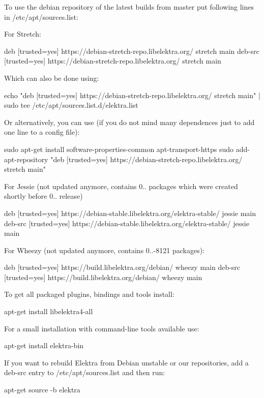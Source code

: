To use the debian repository of the latest builds from master put following lines in {\ttfamily /etc/apt/sources.list}\+:

For Stretch\+: \begin{DoxyVerb}    deb     [trusted=yes] https://debian-stretch-repo.libelektra.org/ stretch main
    deb-src [trusted=yes] https://debian-stretch-repo.libelektra.org/ stretch main
\end{DoxyVerb}


Which can also be done using\+: \begin{DoxyVerb}    echo "deb     [trusted=yes] https://debian-stretch-repo.libelektra.org/ stretch main" | sudo tee /etc/apt/sources.list.d/elektra.list
\end{DoxyVerb}


Or alternatively, you can use (if you do not mind many dependences just to add one line to a config file)\+: \begin{DoxyVerb}    sudo apt-get install software-properties-common apt-transport-https
    sudo add-apt-repository "deb     [trusted=yes] https://debian-stretch-repo.libelektra.org/ stretch main"
\end{DoxyVerb}


For Jessie (not updated anymore, contains 0.. packages which were created shortly before 0.. release) \begin{DoxyVerb}    deb     [trusted=yes] https://debian-stable.libelektra.org/elektra-stable/ jessie main
    deb-src [trusted=yes] https://debian-stable.libelektra.org/elektra-stable/ jessie main
\end{DoxyVerb}


For Wheezy (not updated anymore, contains 0..-\/8121 packages)\+: \begin{DoxyVerb}    deb     [trusted=yes] https://build.libelektra.org/debian/ wheezy main
    deb-src [trusted=yes] https://build.libelektra.org/debian/ wheezy main
\end{DoxyVerb}


To get all packaged plugins, bindings and tools install\+: \begin{DoxyVerb}    apt-get install libelektra4-all
\end{DoxyVerb}


For a small installation with command-\/line tools available use\+: \begin{DoxyVerb}    apt-get install elektra-bin
\end{DoxyVerb}


If you want to rebuild Elektra from Debian unstable or our repositories, add a {\ttfamily deb-\/src} entry to {\ttfamily /etc/apt/sources.list} and then run\+: \begin{DoxyVerb}    apt-get source -b elektra
\end{DoxyVerb}


